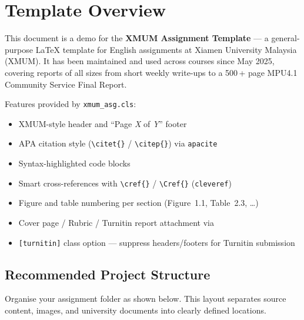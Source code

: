 %

\section{Template Overview}

This document is a demo for the \textbf{XMUM Assignment Template} —
a general-purpose \LaTeX{} template for English assignments at
Xiamen University Malaysia (XMUM).
It has been maintained and used across courses since May 2025,
covering reports of all sizes from short weekly write-ups to a
500\,+ page MPU4.1 Community Service Final Report.

Features provided by \texttt{xmum\_asg.cls}:

\begin{itemize}
    \item XMUM-style header and ``Page \textit{X} of \textit{Y}'' footer
    \item APA citation style (\verb|\citet{}| / \verb|\citep{}|) via \texttt{apacite}
    \item Syntax-highlighted code blocks
    \item Smart cross-references with \verb|\cref{}| / \verb|\Cref{}| (\texttt{cleveref})
    \item Figure and table numbering per section (Figure~1.1, Table~2.3, \ldots)
    \item Cover page / Rubric / Turnitin report attachment via \verb||
    \item \texttt{[turnitin]} class option — suppress headers/footers for Turnitin submission
\end{itemize}

\subsection{Recommended Project Structure}

Organise your assignment folder as shown below.
This layout separates source content, images, and university documents
into clearly defined locations.

